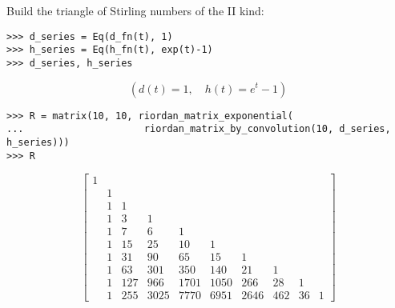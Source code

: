 \begin{example}
Build the triangle of Stirling numbers of the II kind:
\begin{verbatim}
>>> d_series = Eq(d_fn(t), 1)
>>> h_series = Eq(h_fn(t), exp(t)-1)
>>> d_series, h_series 
\end{verbatim}
\begin{displaymath}
\left ( d{\left (t \right )} = 1, \quad h{\left (t \right )} = e^{t} - 1\right )
\end{displaymath}
\begin{verbatim}
>>> R = matrix(10, 10, riordan_matrix_exponential(
...                     riordan_matrix_by_convolution(10, d_series, h_series)))
>>> R
\end{verbatim}
\begin{displaymath}
\left[\begin{matrix}1 &   &   &   &   &   &   &   &   &  \\  & 1 &   &   &   &   &   &   &   &  \\  & 1 & 1 &   &   &   &   &   &   &  \\  & 1 & 3 & 1 &   &   &   &   &   &  \\  & 1 & 7 & 6 & 1 &   &   &   &   &  \\  & 1 & 15 & 25 & 10 & 1 &   &   &   &  \\  & 1 & 31 & 90 & 65 & 15 & 1 &   &   &  \\  & 1 & 63 & 301 & 350 & 140 & 21 & 1 &   &  \\  & 1 & 127 & 966 & 1701 & 1050 & 266 & 28 & 1 &  \\  & 1 & 255 & 3025 & 7770 & 6951 & 2646 & 462 & 36 & 1\end{matrix}\right]
\end{displaymath}
\end{example}
